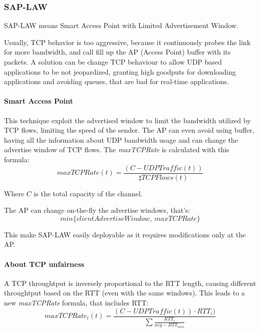 \subsubsection{SAP-LAW}

SAP-LAW means Smart Access Point with Limited Advertisement Window.

Usually, TCP behavior is too aggressive, because it continuously probes the link
for more bandwidth, and call fill up the AP (Access Point) buffer with its
packets. A solution can be change TCP behaviour to allow UDP based applications
to be not jeopardized, granting high goodputs for downloading applications and
avoiding queues, that are bad for real-time applications.

\paragraph*{Smart Access Point} This technique exploit the advertised window to
limit the bandwidth utilized by TCP flows, limiting the speed of the sender. The AP can even avoid using buffer, having all the information about UDP bandwidth usage and can change the advertise window of TCP flows. The \textit{maxTCPRate} is calculated with this formula:
\begin{equation}
  maxTCPRate(t) = \frac{(C - UDPTraffic(t))}{\sharp TCPFlows(t)}
\end{equation}

Where $C$ is the total capacity of the channel.

The AP can change on-the-fly the advertise windows, that's:
\begin{equation*}
  min \{clientAdvertiseWindow,\ maxTCPRate \}
\end{equation*}

This make SAP-LAW easily deployable as it requires modifications only at the AP.

\paragraph*{About TCP unfairness} A TCP throughtput is inversely proportional to the RTT length, causing different throughtput based on the RTT (even with the same windows). This leads to a new \textit{maxTCPRate} formula, that includes RTT:
\begin{equation}
maxTCPRate_{i}(t) = \frac{(C - UDPTraffic(t)) \cdot RTT_i)}{\sum \frac{RTT_i}{avg - RTT_{min}}}
\end{equation}


